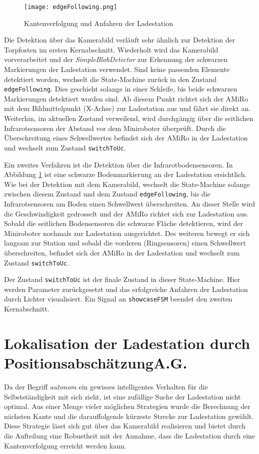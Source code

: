 \begin{figure}[H]
	\begin{center}
		\texttt{[image: edgeFollowing.png]} 	
		\caption{Kantenverfolgung und Anfahren der Ladestation}
		\label{fig:edgeFollowing}
	\end{center}
\end{figure}

Die Detektion über das Kamerabild verläuft sehr ähnlich zur Detektion der Torpfosten im ersten Kernabschnitt. Wiederholt wird das Kamerabild vorverarbeitet und der \textit{SimpleBlobDetector} zur Erkennung der schwarzen Markierungen der Ladestation verwendet. Sind keine passenden Elemente detektiert worden, wechselt die State-Machine zurück in den Zustand \texttt{edgeFollowing}. Dies geschieht solange in einer Schleife, bis beide schwarzen Markierungen detektiert worden sind. Ab diesem Punkt richtet sich der AMiRo mit dem Bildmittelpunkt (X-Achse) zur Ladestation aus und fährt sie direkt an. Weiterhin, im aktuellen Zustand verweilend, wird durchgängig über die seitlichen Infrarotsensoren der Abstand vor dem Miniroboter überprüft. Durch die Überschreitung eines Schwellwertes befindet sich der AMiRo in der Ladestation und wechselt zum Zustand \texttt{switchToUc}.

Ein zweites Verfahren ist die Detektion über die Infrarotbodensensoren. In Abbildung \ref{fig:edgeFollowing} ist eine schwarze Bodenmarkierung an der Ladestation ersichtlich. Wie bei der Detektion mit dem Kamerabild, wechselt die State-Machine solange zwischen diesem Zustand und dem Zustand \texttt{edgeFollowing}, bis die Infrarotsensoren am Boden einen Schwellwert überschreiten. An dieser Stelle wird die Geschwindigkeit gedrosselt und der AMiRo richtet sich zur Ladestation aus. Sobald die seitlichen Bodensensoren die schwarze Fläche detektieren, wird der Miniroboter nochmals zur Ladestation ausgerichtet. Des weiteren bewegt er sich langsam zur Station und sobald die vorderen (Ringsensoren) einen Schwellwert überschreiten, befindet sich der AMiRo in der Ladestation und wechselt zum Zustand \texttt{switchToUc}.

Der Zustand \texttt{switchToUc} ist der finale Zustand in dieser State-Machine. Hier werden Parameter zurückgesetzt und das erfolgreiche Anfahren der Ladestation durch Lichter visualisiert. Ein Signal an \texttt{showcaseFSM} beendet den zweiten Kernabschnitt.

\section[Lokalisation der Ladestation durch Positionsabschätzung]{Lokalisation der Ladestation durch Positionsabschätzung\hfill {\normalsize A.G.}} \label{cha:Lokalisation der Ladestation}
Da der Begriff \textit{autonom} ein gewisses intelligentes Verhalten für die Selbstständigkeit mit sich zieht, ist eine zufällige Suche der Ladestation nicht optimal. Aus einer Menge vieler möglichen Strategien wurde die Berechnung der nächsten Kante und die darauffolgende kürzeste Strecke zur Ladestation gewählt. Diese Strategie lässt sich gut über das Kamerabild realisieren und bietet durch die Aufteilung eine Robustheit mit der Annahme, dass die Ladestation durch eine Kantenverfolgung erreicht werden kann.

